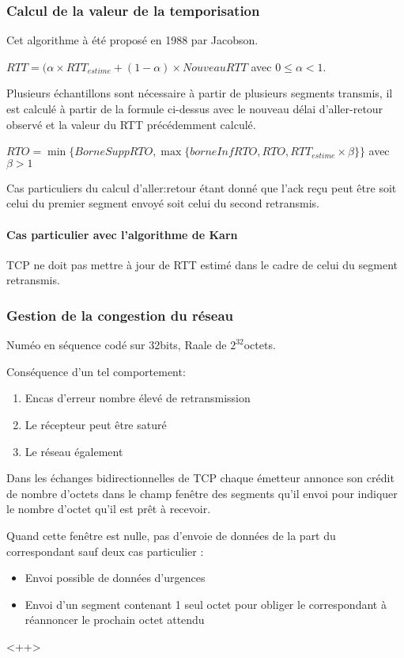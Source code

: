 \documentclass[12pt,a4paper,openany]{book}
\begin{document}
		\subsubsection{Calcul de la valeur de la temporisation}
		Cet algorithme à été proposé en 1988 par Jacobson.

		$RTT = (\alpha\times RTT_{estime} + (1-\alpha)\times NouveauRTT$ avec $0 \leq \alpha < 1$.

		Plusieurs échantillons sont nécessaire à partir de plusieurs segments transmis, il est calculé à partir de la formule ci-dessus avec le nouveau
		délai d'aller-retour observé et la valeur du RTT précédemment calculé.

		$RTO = \min\{BorneSuppRTO, \max\{borneInfRTO, RTO, RTT_{estime} \times \beta\}\}$ avec $\beta > 1$

		\begin{remarque}
			Cas particuliers du calcul d'aller:retour étant donné que l'ack reçu peut être soit celui du premier segment envoyé soit celui du second
			retransmis.
		\end{remarque}

		\paragraph{Cas particulier avec l'algorithme de Karn}
		TCP ne doit pas mettre à jour de RTT estimé dans le cadre de celui du segment retransmis.
		\subsubsection{Gestion de la congestion du réseau}
		Numéo en séquence codé sur 32bits, Raale de $2^{32}$octets.

		Conséquence d'un tel comportement: 
		\begin{enumerate}
			\item Encas d'erreur nombre élevé de retransmission
			\item Le récepteur peut être saturé
			\item Le réseau également
		\end{enumerate}

		Dans les échanges bidirectionnelles de TCP chaque émetteur annonce son crédit de nombre d'octets dans le champ fenêtre des segments qu'il
		envoi pour indiquer  le nombre d'octet qu'il est prêt à recevoir.

		Quand cette fenêtre est nulle, pas d'envoie de données de la part du correspondant sauf deux cas particulier : 
		\begin{itemize}
			\item Envoi possible de données d'urgences
			\item Envoi d'un segment contenant 1 seul octet pour obliger le correspondant à réannoncer le prochain octet attendu
		\end{itemize}<++>
\end{document}
